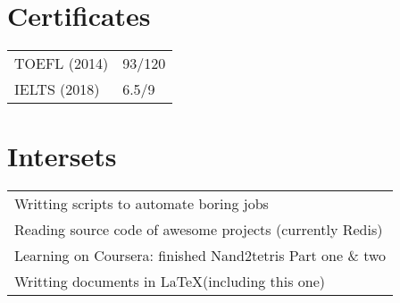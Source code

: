 \documentclass[11pt,a4paper]{article}
\begin{document}
\section{Certificates}

\noindent\begin{tabular}{p{7cm} l}
	TOEFL (2014) & 93/120\\
	IELTS (2018) & 6.5/9\\
\end{tabular}

\section{Intersets}\noindent
\begin{tabular}{p{15cm}}
	Writting scripts to automate boring jobs\\
	Reading source code of awesome projects (currently Redis)\\
	Learning on Coursera: finished Nand2tetris Part one \& two\\
	Writting documents in \LaTeX (including this one)\\
\end{tabular}
\end{document}
